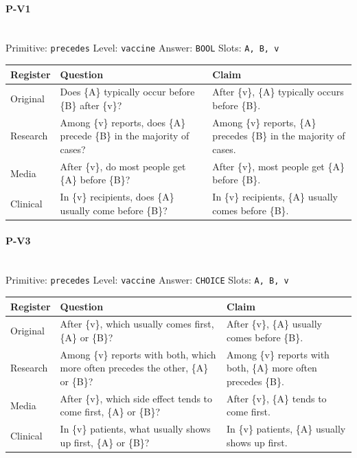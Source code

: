 \documentclass[11pt]{article}
\begin{document}
\paragraph{\textbf{P-V1}}\mbox{}\\
Primitive: \texttt{precedes} \quad Level: \texttt{vaccine} \quad Answer: \texttt{BOOL} \quad Slots: \texttt{A, B, v}\\[2pt]
\begin{tabularx}{\linewidth}{@{}l L L@{}}
\toprule
\textbf{Register} & \textbf{Question} & \textbf{Claim} \\
\midrule
Original & Does \{A\} typically occur before \{B\} after \{v\}? & After \{v\}, \{A\} typically occurs before \{B\}. \\
Research & Among \{v\} reports, does \{A\} precede \{B\} in the majority of cases? & Among \{v\} reports, \{A\} precedes \{B\} in the majority of cases. \\
Media & After \{v\}, do most people get \{A\} before \{B\}? & After \{v\}, most people get \{A\} before \{B\}. \\
Clinical & In \{v\} recipients, does \{A\} usually come before \{B\}? & In \{v\} recipients, \{A\} usually comes before \{B\}. \\
\bottomrule
\end{tabularx}
\vspace{4pt}

\paragraph{\textbf{P-V3}}\mbox{}\\
Primitive: \texttt{precedes} \quad Level: \texttt{vaccine} \quad Answer: \texttt{CHOICE} \quad Slots: \texttt{A, B, v}\\[2pt]
\begin{tabularx}{\linewidth}{@{}l L L@{}}
\toprule
\textbf{Register} & \textbf{Question} & \textbf{Claim} \\
\midrule
Original & After \{v\}, which usually comes first, \{A\} or \{B\}? & After \{v\}, \{A\} usually comes before \{B\}. \\
Research & Among \{v\} reports with both, which more often precedes the other, \{A\} or \{B\}? & Among \{v\} reports with both, \{A\} more often precedes \{B\}. \\
Media & After \{v\}, which side effect tends to come first, \{A\} or \{B\}? & After \{v\}, \{A\} tends to come first. \\
Clinical & In \{v\} patients, what usually shows up first, \{A\} or \{B\}? & In \{v\} patients, \{A\} usually shows up first. \\
\bottomrule
\end{tabularx}
\vspace{4pt}
\end{document}
